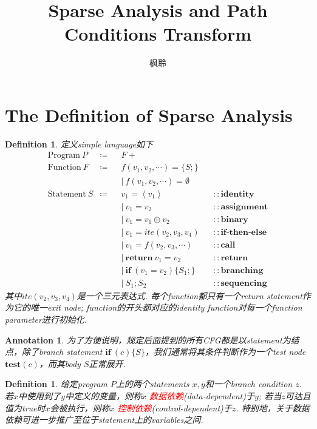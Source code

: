 \documentclass{article}
\newtheorem{definition}[theorem]{Definition}
\newtheorem{annotation}[theorem]{Annotation}
\newcommand{\redt}[1]{\textcolor{red}{#1}}
\newcommand{\abracket}[1]{\ensuremath{\left< #1 \right>}}
\begin{document}
\title{Sparse Analysis and Path Conditions Transform}
\author{枫聆}
\maketitle
\tableofcontents

\newpage
\section{The Definition of Sparse Analysis}

\begin{definition}
\rm 定义simple language如下
$$
\begin{aligned}
\text{Program}~P & \coloneqq && F+ \\
\text{Function}~F  & \coloneqq &&  f(v_1,v_2,\cdots) = \{S;\} \\
&&& |~f(v_1,v_2,\cdots) = \emptyset \\
\text{Statement}~S & \coloneqq && v_1 = \abracket{v_1} && ::\textbf{identity} \\
&&& |~v_1 = v_2  && ::\textbf{assignment} \\
&&& |~v_1 = v_1 \oplus v_2  && ::\textbf{binary}\\
&&& |~v_1 = ite(v_2,v_3,v_4) && ::\textbf{if-then-else} \\
&&& |~v_1 = f(v_2,v_3,\cdots)  && ::\textbf{call}\\
&&& |~\textbf{return}~ v_1 = v_2  && ::\textbf{return}\\
&&& |~\textbf{if}~(v_1=v_2)\{S_1;\}  && ::\textbf{branching}\\
&&& |~S_1;S_2 && ::\textbf{sequencing}
\end{aligned}
$$
其中$ite(v_2,v_3,v_4)$是一个三元表达式. 每个function都只有一个return statement作为它的唯一exit node; function的开头都对应的identity function对每一个function parameter进行初始化. 
\end{definition}

\begin{annotation}
\rm 为了方便说明，规定后面提到的所有CFG都是以statement为结点，除了branch statement $\textbf{if}~(c)\{S\}$，我们通常将其条件判断作为一个test node $\textbf{test}(c)$，而其body $S$正常展开.    
\end{annotation}

\begin{definition}
\rm 给定program $P$上的两个statements $x,y$和一个branch condition $z$. 若$x$中使用到了$y$中定义的变量，则称$x$ \redt{数据依赖}(data-dependent)于$y$; 若当$z$可达且值为true时$x$会被执行，则称$x$ \redt{控制依赖}(control-dependent)于$z$. 特别地，关于数据依赖可进一步推广至位于statement上的variables之间.
\end{definition}
\end{document}
